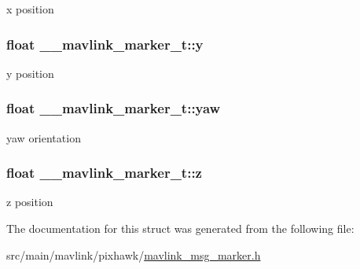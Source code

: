 x position 

\hypertarget{struct____mavlink__marker__t_a6a8f15a2d48ffd78446f95c0d813b524}{
\subsubsection[{y}]{\setlength{\rightskip}{0pt plus 5cm}float \+\_\+\+\_\+mavlink\+\_\+marker\+\_\+t\+::y}}\label{struct____mavlink__marker__t_a6a8f15a2d48ffd78446f95c0d813b524}


y position 

\hypertarget{struct____mavlink__marker__t_ac61ec0e56487b433a66cf489a618d8c0}{
\subsubsection[{yaw}]{\setlength{\rightskip}{0pt plus 5cm}float \+\_\+\+\_\+mavlink\+\_\+marker\+\_\+t\+::yaw}}\label{struct____mavlink__marker__t_ac61ec0e56487b433a66cf489a618d8c0}


yaw orientation 

\hypertarget{struct____mavlink__marker__t_a386320a826f2c5dc875e4d9102e914ca}{
\subsubsection[{z}]{\setlength{\rightskip}{0pt plus 5cm}float \+\_\+\+\_\+mavlink\+\_\+marker\+\_\+t\+::z}}\label{struct____mavlink__marker__t_a386320a826f2c5dc875e4d9102e914ca}


z position 



The documentation for this struct was generated from the following file\+:\begin{DoxyCompactItemize}
\item 
src/main/mavlink/pixhawk/\hyperlink{mavlink__msg__marker_8h}{mavlink\+\_\+msg\+\_\+marker.\+h}\end{DoxyCompactItemize}

